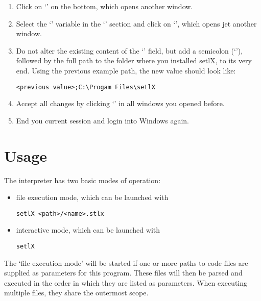 \begin{enumerate}
\begin{enumerate}
\begin{itemize}
		\end{itemize}
		\item Click on `' on the bottom, which opens another window.
		\item Select the `' variable in the `' section and click on `', which opens jet another window.
		\item Do not alter the existing content of the `' field, but add a semicolon (`\command{;}'), followed by the full path to the folder where you installed setlX, to its very end. Using the previous example path, the new value should look like:
\begin{lstlisting}[frame=none,numbers=none]
<previous value>;C:\Progam Files\setlX
\end{lstlisting}
		\item Accept all changes by clicking `' in all windows you opened before.
		\item End you current session and login into Windows again.
	\end{enumerate}
\end{enumerate}

\newpage

\section{Usage}

The \setlX{} interpreter has two basic modes of operation:

\begin{itemize}
	\item file execution mode, which can be launched with
\begin{lstlisting}[frame=none,numbers=none]
setlX <path>/<name>.stlx
\end{lstlisting}
	\item interactive mode, which can be launched with
\begin{lstlisting}[frame=none,numbers=none]
setlX
\end{lstlisting}
\end{itemize}

The `file execution mode' will be started if one or more paths to code files are supplied as parameters for this program. These files will then be parsed and executed in the order in which they are listed as parameters. When executing multiple files, they share the outermost scope.

